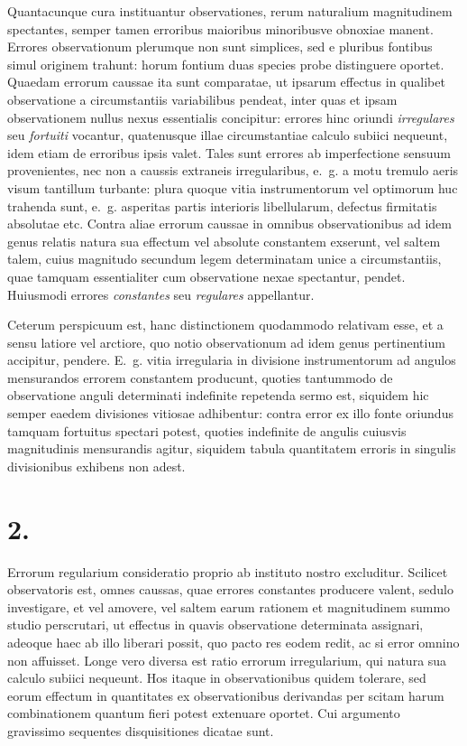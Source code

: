 \documentclass[12pt,a4paper]{book}
\begin{document}
Quantacunque cura instituantur observationes, rerum naturalium magnitudinem spectantes, semper tamen erroribus maioribus minoribusve obnoxiae manent. Errores observationum plerumque non sunt simplices, sed e pluribus fontibus simul originem trahunt: horum fontium duas species probe distinguere oportet. Quaedam errorum caussae ita sunt comparatae, ut ipsarum effectus in qualibet observatione a circumstantiis variabilibus pendeat, inter quas et ipsam observationem nullus nexus essentialis concipitur: errores hinc oriundi \textit{irregulares} seu \textit{fortuiti} vocantur, quatenusque illae circumstantiae calculo subiici nequeunt, idem etiam de erroribus ipsis valet. Tales sunt errores ab imperfectione sensuum provenientes, nec non a caussis extraneis irregularibus, e.~g. a motu tremulo aeris visum tantillum turbante: plura quoque vitia instrumentorum vel optimorum huc trahenda sunt, e.~g. asperitas partis interioris libellularum, defectus firmitatis absolutae etc. Contra aliae errorum caussae in omnibus observationibus ad idem genus relatis natura sua effectum vel absolute constantem exserunt, vel saltem talem, cuius magnitudo secundum legem determinatam unice a circumstantiis, quae tamquam essentialiter cum observatione nexae spectantur, pendet. Huiusmodi errores \textit{constantes} seu \textit{regulares} appellantur.

Ceterum perspicuum est, hanc distinctionem quodammodo relativam esse, et a sensu latiore vel arctiore, quo notio observationum ad idem genus pertinentium accipitur, pendere. E.~g. vitia irregularia in divisione instrumentorum ad angulos mensurandos errorem constantem producunt, quoties tantummodo de observatione anguli determinati indefinite repetenda sermo est, siquidem hic semper eaedem divisiones vitiosae adhibentur: contra error ex illo fonte oriundus tamquam fortuitus spectari potest, quoties indefinite de angulis cuiusvis magnitudinis mensurandis agitur, siquidem tabula quantitatem erroris in singulis divisionibus exhibens non adest.

\section*{2.}
\label{sec:art2}

Errorum regularium consideratio proprio ab instituto nostro excluditur. Scilicet observatoris est, omnes caussas, quae errores constantes producere valent, sedulo investigare, et vel amovere, vel saltem earum rationem et magnitudinem summo studio perscrutari, ut effectus in quavis observatione determinata assignari, adeoque haec ab illo liberari possit, quo pacto res eodem redit, ac si error omnino non affuisset. Longe vero diversa est ratio errorum irregularium, qui natura sua calculo subiici nequeunt. Hos itaque in observationibus quidem tolerare, sed eorum effectum in quantitates ex observationibus derivandas per scitam harum combinationem quantum fieri potest extenuare oportet. Cui argumento gravissimo sequentes disquisitiones dicatae sunt.
\end{document}
